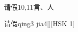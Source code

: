 \begin{entry}{请假}{10,11}{⾔、⼈}
  \begin{phonetics}{请假}{qing3 jia4}[][HSK 1]
  \end{phonetics}
\end{entry}
